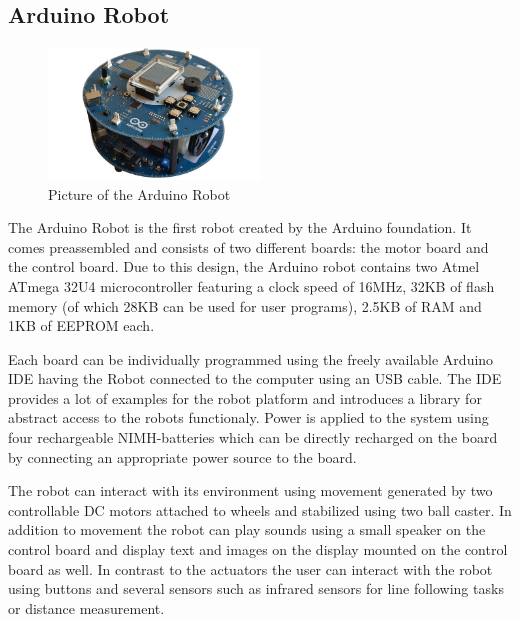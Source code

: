 \documentclass[11pt,a4paper]{article}
\begin{document}
\subsection{Arduino Robot}
\begin{figure}[h!]
  \centering
  \includegraphics[width=0.5\textwidth]{images/arduinorobot.jpg}
  \caption{Picture of the Arduino Robot}
\end{figure}

The Arduino Robot is the first robot created by the Arduino foundation. It comes preassembled and consists of two different boards: the motor board and the control board. Due to this design, the Arduino robot contains two Atmel ATmega 32U4 microcontroller featuring a clock speed of 16MHz, 32KB of flash memory (of which 28KB can be used for user programs), 2.5KB of RAM and 1KB of EEPROM each.

Each board can be individually programmed using the freely available Arduino IDE having the Robot connected to the computer using an USB cable. The IDE provides a lot of examples for the robot platform and introduces a library for abstract access to the robots functionaly. Power is applied to the system using four rechargeable NIMH-batteries which can be directly recharged on the board by connecting an appropriate power source to the board.

The robot can interact with its environment using movement generated by two controllable DC motors attached to wheels and stabilized using two ball caster. In addition to movement the robot can play sounds using a small speaker on the control board and display text and images on the display mounted on the control board as well. In contrast to the actuators the user can interact with the robot using buttons and several sensors such as infrared sensors for line following tasks or distance measurement.
\end{document}
